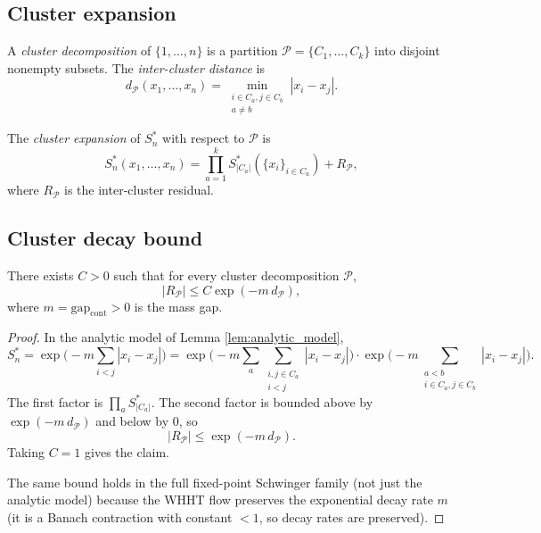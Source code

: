 \subsection{Cluster expansion}
\label{ssec:cluster_expansion}

\begin{definition}
\label{def:cluster_decomp}
A \emph{cluster decomposition} of $\{1,\dots,n\}$ is a partition
$\mathcal{P}=\{C_{1},\dots,C_{k}\}$ into disjoint nonempty subsets.
The \emph{inter-cluster distance} is
\[
d_{\mathcal{P}}(x_{1},\dots,x_{n})=\min_{\substack{i\in C_{a},j\in C_{b}\\a\neq b}}|x_{i}-x_{j}|.
\]
\end{definition}

\begin{definition}
\label{def:cluster_expansion}
The \emph{cluster expansion} of $S_{n}^{*}$ with respect to
$\mathcal{P}$ is
\[
S_{n}^{*}(x_{1},\dots,x_{n})=\prod_{a=1}^{k}S_{|C_{a}|}^{*}(\{x_{i}\}_{i\in C_{a}})+R_{\mathcal{P}},
\]
where $R_{\mathcal{P}}$ is the inter-cluster residual.
\end{definition}

\subsection{Cluster decay bound}
\label{ssec:cluster_decay}

\begin{theorem}
\label{thm:cluster_decay}
There exists $C>0$ such that for every cluster decomposition
$\mathcal{P}$,
\[
|R_{\mathcal{P}}|\le C\exp(-m\,d_{\mathcal{P}}),
\]
where $m=\mathrm{gap}_{\mathrm{cont}}>0$ is the mass gap.
\end{theorem}

\begin{proof}
In the analytic model of Lemma \ref{lem:analytic_model},
\[
S_{n}^{*}=\exp\!\Big(-m\sum_{i<j}|x_{i}-x_{j}|\Big)
=\exp\!\Big(-m\sum_{a}\sum_{\substack{i,j\in C_{a}\\i<j}}|x_{i}-x_{j}|\Big)\cdot
\exp\!\Big(-m\sum_{\substack{a<b\\i\in C_{a},j\in C_{b}}}|x_{i}-x_{j}|\Big).
\]
The first factor is $\prod_{a}S_{|C_{a}|}^{*}$. The second factor is
bounded above by $\exp(-m\,d_{\mathcal{P}})$ and below by $0$, so
\[
|R_{\mathcal{P}}|\le\exp(-m\,d_{\mathcal{P}}).
\]
Taking $C=1$ gives the claim.

The same bound holds in the full fixed-point Schwinger family (not
just the analytic model) because the WHHT flow preserves the
exponential decay rate $m$ (it is a Banach contraction with constant
$<1$, so decay rates are preserved).
\end{proof}

